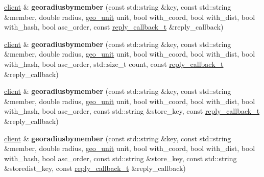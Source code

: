 \begin{DoxyCompactItemize}
\item 
\mbox{\label{classcpp__redis_1_1client_ad3bf74f6f3b0094311dd8d8c4dede6eb}} 
\hyperlink{classcpp__redis_1_1client}{client} \& {\bfseries georadiusbymember} (const std\+::string \&key, const std\+::string \&member, double radius, \hyperlink{classcpp__redis_1_1client_aa5998536fd32ff4387c89be514997620}{geo\+\_\+unit} unit, bool with\+\_\+coord, bool with\+\_\+dist, bool with\+\_\+hash, bool asc\+\_\+order, const \hyperlink{classcpp__redis_1_1client_a061a1140d36d2eaeda82b09a0bb3f9f2}{reply\+\_\+callback\+\_\+t} \&reply\+\_\+callback)
\item 
\mbox{\label{classcpp__redis_1_1client_ab0e0b3210b502462f50e517e8ec1d539}} 
\hyperlink{classcpp__redis_1_1client}{client} \& {\bfseries georadiusbymember} (const std\+::string \&key, const std\+::string \&member, double radius, \hyperlink{classcpp__redis_1_1client_aa5998536fd32ff4387c89be514997620}{geo\+\_\+unit} unit, bool with\+\_\+coord, bool with\+\_\+dist, bool with\+\_\+hash, bool asc\+\_\+order, std\+::size\+\_\+t count, const \hyperlink{classcpp__redis_1_1client_a061a1140d36d2eaeda82b09a0bb3f9f2}{reply\+\_\+callback\+\_\+t} \&reply\+\_\+callback)
\item 
\mbox{\label{classcpp__redis_1_1client_ad84f7842632adef761532d40c8e741b8}} 
\hyperlink{classcpp__redis_1_1client}{client} \& {\bfseries georadiusbymember} (const std\+::string \&key, const std\+::string \&member, double radius, \hyperlink{classcpp__redis_1_1client_aa5998536fd32ff4387c89be514997620}{geo\+\_\+unit} unit, bool with\+\_\+coord, bool with\+\_\+dist, bool with\+\_\+hash, bool asc\+\_\+order, const std\+::string \&store\+\_\+key, const \hyperlink{classcpp__redis_1_1client_a061a1140d36d2eaeda82b09a0bb3f9f2}{reply\+\_\+callback\+\_\+t} \&reply\+\_\+callback)
\item 
\mbox{\label{classcpp__redis_1_1client_a0fd55ebd3fc2904a9e3de8e8c7fd1e28}} 
\hyperlink{classcpp__redis_1_1client}{client} \& {\bfseries georadiusbymember} (const std\+::string \&key, const std\+::string \&member, double radius, \hyperlink{classcpp__redis_1_1client_aa5998536fd32ff4387c89be514997620}{geo\+\_\+unit} unit, bool with\+\_\+coord, bool with\+\_\+dist, bool with\+\_\+hash, bool asc\+\_\+order, const std\+::string \&store\+\_\+key, const std\+::string \&storedist\+\_\+key, const \hyperlink{classcpp__redis_1_1client_a061a1140d36d2eaeda82b09a0bb3f9f2}{reply\+\_\+callback\+\_\+t} \&reply\+\_\+callback)

\end{DoxyCompactItemize}

